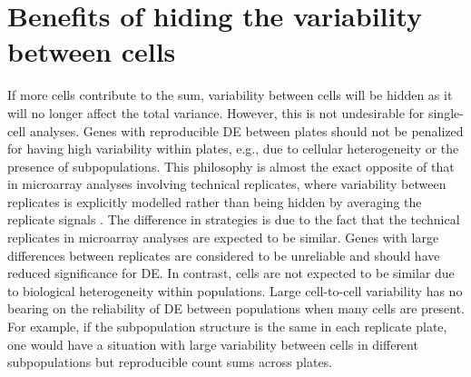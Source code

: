 \documentclass{article}
\begin{document}
\section{Benefits of hiding the variability between cells}
If more cells contribute to the sum, variability between cells will be hidden as it will no longer affect the total variance.
However, this is not undesirable for single-cell analyses.
Genes with reproducible DE between plates should not be penalized for having high variability within plates, e.g., due to cellular heterogeneity or the presence of subpopulations.
This philosophy is almost the exact opposite of that in microarray analyses involving technical replicates,
    where variability between replicates is explicitly modelled rather than being hidden by averaging the replicate signals \citep{smyth2005use}.
The difference in strategies is due to the fact that the technical replicates in microarray analyses are expected to be similar.
Genes with large differences between replicates are considered to be unreliable and should have reduced significance for DE.
In contrast, cells are not expected to be similar due to biological heterogeneity within populations.
Large cell-to-cell variability has no bearing on the reliability of DE between populations when many cells are present.
For example, if the subpopulation structure is the same in each replicate plate, one would have a situation with large variability between cells in different subpopulations but reproducible count sums across plates.

% 
\end{document}
